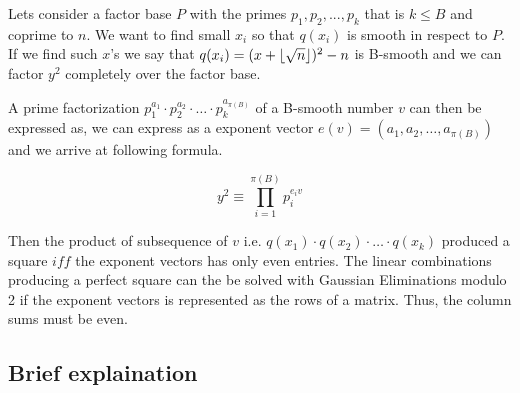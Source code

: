 Lets consider a factor base $P$ with the primes $p_1, p_2, ..., p_k$ that is $k \leq B$ and coprime to $n$.
We want to find small $x_i$ so that $q(x_i)$ is smooth in respect to $P$. If we find such $x$'s we say that $q(x_i) = (x + \left \lfloor \sqrt{n} \right \rfloor)^2-n$
is B-smooth and we can factor $y^2$ completely over the factor base.

A prime factorization $p_1^{a_1} \cdot p_2^{a_2} \cdot \ldots \cdot p_k^{a_{\pi(B)}}$ of a B-smooth number $v$ can then be expressed as,
we can express as a exponent vector $e(v) = (a_1, a_2, \ldots, a_{\pi(B)})$ and we arrive at following formula.

\begin{equation}
y^2 \equiv \prod_{i=1}^{\pi(B)} p_i^{e_i{v}}
\end{equation}

Then the product of subsequence of $v$ i.e. $q(x_1) \cdot q(x_2) \cdot \ldots \cdot q(x_k)$ produced a 
square $iff$ the exponent vectors has only even entries. The linear combinations producing 
a perfect square can the be solved with Gaussian Eliminations modulo 2 if the exponent vectors
is represented as the rows of a matrix. Thus, the column sums must be even.

\subsection{Brief explaination}